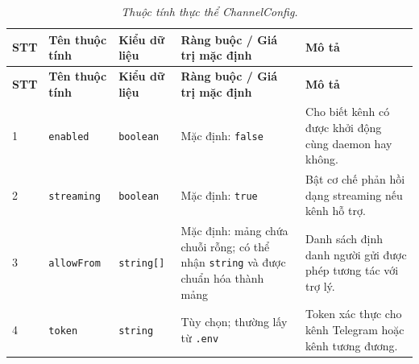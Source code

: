 \begin{longtable}{|p{0.55cm}|p{2.55cm}|p{2.7cm}|p{3.25cm}|p{4.0cm}|}
\caption{\emph{Thuộc tính thực thể ChannelConfig.}}\label{tab:erd-channel-config}\\
\hline
\textbf{STT} & \textbf{Tên thuộc tính} & \textbf{Kiểu dữ liệu} & \textbf{Ràng buộc / Giá trị mặc định} & \textbf{Mô tả} \\
\hline
\endfirsthead
\hline
\textbf{STT} & \textbf{Tên thuộc tính} & \textbf{Kiểu dữ liệu} & \textbf{Ràng buộc / Giá trị mặc định} & \textbf{Mô tả} \\
\hline
\endhead
1 & \texttt{enabled} & \texttt{boolean} & Mặc định: \texttt{false} & Cho biết kênh có được khởi động cùng daemon hay không. \\
\hline
2 & \texttt{streaming} & \texttt{boolean} & Mặc định: \texttt{true} & Bật cơ chế phản hồi dạng streaming nếu kênh hỗ trợ. \\
\hline
3 & \texttt{allowFrom} & \texttt{string[]} & Mặc định: mảng chứa chuỗi rỗng; có thể nhận \texttt{string} và được chuẩn hóa thành mảng & Danh sách định danh người gửi được phép tương tác với trợ lý. \\
\hline
4 & \texttt{token} & \texttt{string} & Tùy chọn; thường lấy từ \texttt{.env} & Token xác thực cho kênh Telegram hoặc kênh tương đương. \\
\hline
\end{longtable}

